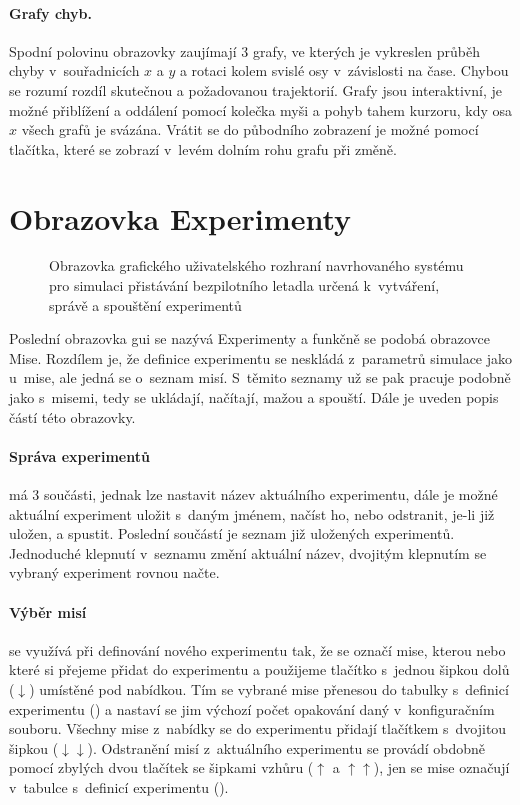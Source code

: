         \paragraph{ Grafy chyb.} Spodní polovinu obrazovky zaujímají 3 grafy, ve kterých je vykreslen průběh chyby v~souřadnicích $x$ a $y$ a rotaci kolem svislé osy v~závislosti na čase. Chybou se rozumí rozdíl skutečnou a požadovanou trajektorií. Grafy jsou interaktivní, je možné přiblížení a oddálení pomocí kolečka myši a pohyb tahem kurzoru, kdy osa $x$ všech grafů je svázána. Vrátit se do půbodního zobrazení je možné pomocí tlačítka, které se zobrazí v~levém dolním rohu grafu při změně.
    \section{Obrazovka Experimenty} \label{sec:experimenty}
        \begin{figure}
            \centering
            
            \caption[GUI: Obrazovka ]{Obrazovka  grafického uživatelského rozhraní navrhovaného systému pro simulaci přistávání bezpilotního letadla určená k~vytváření, správě a spouštění experimentů}
            \label{fig:tabExperimenty}
        \end{figure}
        Poslední obrazovka \acrshort{gui} se nazývá Experimenty a funkčně se podobá obrazovce Mise. Rozdílem je, že definice experimentu se neskládá z~parametrů simulace jako u~mise, ale jedná se o~seznam misí. S~těmito seznamy už se pak pracuje podobně jako s~misemi, tedy se ukládají, načítají, mažou a spouští. Dále je uveden popis částí této obrazovky.
        \paragraph{ Správa experimentů} má 3 součásti, jednak lze nastavit název aktuálního experimentu, dále je možné aktuální experiment uložit s~daným jménem, načíst ho, nebo odstranit, je-li již uložen, a spustit. Poslední součástí je seznam již uložených experimentů. Jednoduché klepnutí v~seznamu změní aktuální název, dvojitým klepnutím se vybraný experiment rovnou načte.

        \paragraph{ Výběr misí} se využívá při definování nového experimentu tak, že se označí mise, kterou nebo které si přejeme přidat do experimentu a použijeme tlačítko s~jednou šipkou dolů ($\downarrow$) umístěné pod nabídkou. Tím se vybrané mise přenesou do tabulky s~definicí experimentu () a nastaví se jim výchozí počet opakování daný v~konfiguračním souboru. Všechny mise z~nabídky se do experimentu přidají tlačítkem s~dvojitou šipkou ($\downarrow\downarrow$). Odstranění misí z~aktuálního experimentu se provádí obdobně pomocí zbylých dvou tlačítek se šipkami vzhůru ($\uparrow$ a $\uparrow\uparrow$), jen se mise označují v~tabulce s~definicí experimentu ().

